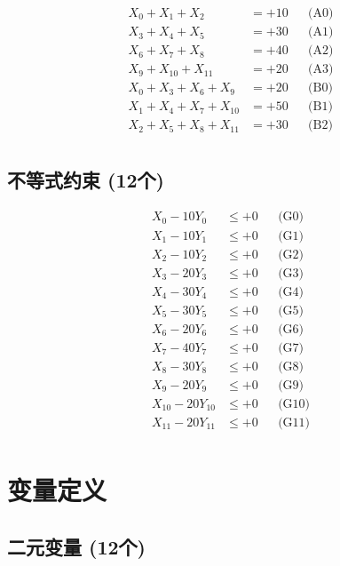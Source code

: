\documentclass[a4paper,10pt]{article}
\begin{document}
\allowdisplaybreaks
{\small
\begin{align}
X_{0} + X_{1} + X_{2} &= +10 && \text{(A0)} \\
X_{3} + X_{4} + X_{5} &= +30 && \text{(A1)} \\
X_{6} + X_{7} + X_{8} &= +40 && \text{(A2)} \\
X_{9} + X_{10} + X_{11} &= +20 && \text{(A3)} \\
X_{0} + X_{3} + X_{6} + X_{9} &= +20 && \text{(B0)} \\
\allowbreak
X_{1} + X_{4} + X_{7} + X_{10} &= +50 && \text{(B1)} \\
X_{2} + X_{5} + X_{8} + X_{11} &= +30 && \text{(B2)} \\
\end{align}
}

\subsection{不等式约束 (12个)}

\allowdisplaybreaks
{\small
\begin{align}
X_{0} - 10Y_{0} &\leq +0 && \text{(G0)} \\
X_{1} - 10Y_{1} &\leq +0 && \text{(G1)} \\
X_{2} - 10Y_{2} &\leq +0 && \text{(G2)} \\
X_{3} - 20Y_{3} &\leq +0 && \text{(G3)} \\
X_{4} - 30Y_{4} &\leq +0 && \text{(G4)} \\
X_{5} - 30Y_{5} &\leq +0 && \text{(G5)} \\
X_{6} - 20Y_{6} &\leq +0 && \text{(G6)} \\
X_{7} - 40Y_{7} &\leq +0 && \text{(G7)} \\
X_{8} - 30Y_{8} &\leq +0 && \text{(G8)} \\
X_{9} - 20Y_{9} &\leq +0 && \text{(G9)} \\
\allowbreak
X_{10} - 20Y_{10} &\leq +0 && \text{(G10)} \\
X_{11} - 20Y_{11} &\leq +0 && \text{(G11)} \\
\end{align}
}

\section{变量定义}

\subsection{二元变量 (12个)}
\end{document}
